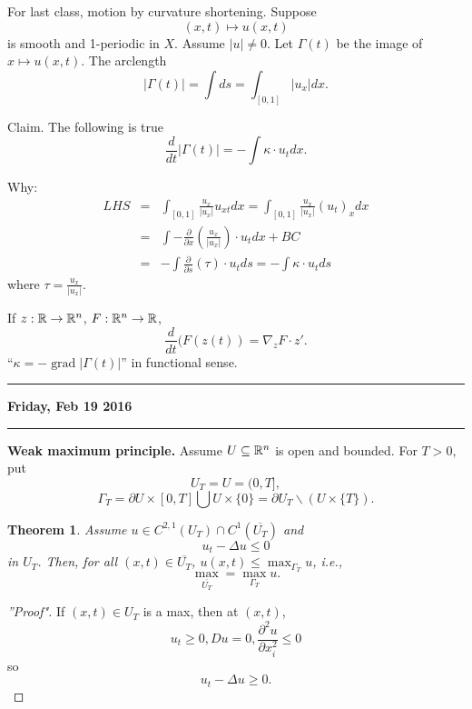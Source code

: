 \documentclass[11pt]{amsart}%
\newtheorem{theorem}{Theorem}
\DeclareMathOperator{\grad}{grad}
\begin{document}
 For last class, motion by curvature shortening. Suppose $$(x,t)\mapsto u(x,t)$$ is smooth and 1-periodic in $X$. Assume $\vert u\vert \not=0$. Let $\Gamma(t)$ be the image of $x\mapsto u(x,t)$. The arclength
 $$\vert \Gamma(t)\vert =\int ds =\int_{[0,1]}\vert u_x\vert dx.$$
 
 Claim. The following is true
 $$\frac{d}{dt}\vert \Gamma(t)\vert = -\int \kappa\cdot u_t dx.$$
 
 Why: \begin{eqnarray*}
    LHS &=& \int_{[0,1]} \frac{u_x}{\vert u_x\vert} u_{xt} dx = \int_{[0,1]} \frac{u_x}{\vert u_x\vert} (u_t)_x dx\\
    &=& \int -\frac{\partial}{\partial x} (\frac{u_x}{\vert u_x\vert})\cdot u_t dx + BC\\
    &=& -\int \frac{\partial}{\partial s}(\tau)\cdot u_t ds=-\int \kappa\cdot u_t ds
 \end{eqnarray*}
 where $\tau=\frac{u_x}{\vert u_x\vert}$. 
 
 If $z:\mathbb{R}\to \mathbb{R}^n$, $F:\mathbb{R}^n\to \mathbb{R}$,
 $$\frac{d}{dt}(F(z(t)) = \nabla_z F\cdot z'.$$
 ``$\kappa = -\grad\vert \Gamma(t)\vert$'' in functional sense.
 
 \begin{center}\rule{0.5\linewidth}{\linethickness}\end{center}

\textbf{Friday, Feb 19 2016}

\begin{center}\rule{0.5\linewidth}{\linethickness}\end{center}

{\bf Weak maximum principle.} Assume $U\subseteq \mathbb{R}^n$ is open and bounded. For $T>0$, put $$U_T=U=(0,T],$$ $$\Gamma_T=\partial U\times [0,T] \bigcup U\times\{0\} =\partial U_T\backslash(U\times\{T\}).$$

\begin{theorem}
    Assume $u\in C^{2,1}(U_T)\cap C^1(\overline{U_T})$ and
    $$u_t -\Delta u \le 0$$ in $U_T$. Then, for all $(x,t) \in \overline{U_T}$, $u(x,t)\le \max_{\Gamma_T} u$, i.e.,
    $$\max_{\overline{U_T}} = \max_{\Gamma_T} u.$$
\end{theorem}

\begin{proof}[''Proof"]
    If $(x,t)\in U_T$ is a max, then at $(x,t)$,
    $$u_t\ge 0, Du=0, \frac{\partial^2 u}{\partial x_i^2} \le 0$$ so $$u_t-\Delta u \ge 0.$$
\end{proof}
\end{document}
